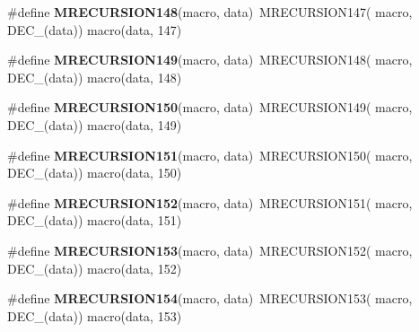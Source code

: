 \begin{DoxyCompactItemize}
\item 
\hypertarget{group__group__sam0__utils__mrecursion_ga2bcf729fdb108d8f8cf420b07388906d}{}\#define {\bfseries M\+R\+E\+C\+U\+R\+S\+I\+O\+N148}(macro,  data)~M\+R\+E\+C\+U\+R\+S\+I\+O\+N147(  macro, D\+E\+C\+\_\+(data))   macro(data, 147)\label{group__group__sam0__utils__mrecursion_ga2bcf729fdb108d8f8cf420b07388906d}

\item 
\hypertarget{group__group__sam0__utils__mrecursion_ga6d1a3c19222c7ee8771101e98a959fb7}{}\#define {\bfseries M\+R\+E\+C\+U\+R\+S\+I\+O\+N149}(macro,  data)~M\+R\+E\+C\+U\+R\+S\+I\+O\+N148(  macro, D\+E\+C\+\_\+(data))   macro(data, 148)\label{group__group__sam0__utils__mrecursion_ga6d1a3c19222c7ee8771101e98a959fb7}

\item 
\hypertarget{group__group__sam0__utils__mrecursion_gabb9799f7a5fef3fb5fa69e1bef4ff318}{}\#define {\bfseries M\+R\+E\+C\+U\+R\+S\+I\+O\+N150}(macro,  data)~M\+R\+E\+C\+U\+R\+S\+I\+O\+N149(  macro, D\+E\+C\+\_\+(data))   macro(data, 149)\label{group__group__sam0__utils__mrecursion_gabb9799f7a5fef3fb5fa69e1bef4ff318}

\item 
\hypertarget{group__group__sam0__utils__mrecursion_gafbbfc4f5157baa8750ce7782323a9f5a}{}\#define {\bfseries M\+R\+E\+C\+U\+R\+S\+I\+O\+N151}(macro,  data)~M\+R\+E\+C\+U\+R\+S\+I\+O\+N150(  macro, D\+E\+C\+\_\+(data))   macro(data, 150)\label{group__group__sam0__utils__mrecursion_gafbbfc4f5157baa8750ce7782323a9f5a}

\item 
\hypertarget{group__group__sam0__utils__mrecursion_ga06ffc91df193dcdab63b568718773b02}{}\#define {\bfseries M\+R\+E\+C\+U\+R\+S\+I\+O\+N152}(macro,  data)~M\+R\+E\+C\+U\+R\+S\+I\+O\+N151(  macro, D\+E\+C\+\_\+(data))   macro(data, 151)\label{group__group__sam0__utils__mrecursion_ga06ffc91df193dcdab63b568718773b02}

\item 
\hypertarget{group__group__sam0__utils__mrecursion_gaa4af965a0bd2fa1bb023f774cbf18132}{}\#define {\bfseries M\+R\+E\+C\+U\+R\+S\+I\+O\+N153}(macro,  data)~M\+R\+E\+C\+U\+R\+S\+I\+O\+N152(  macro, D\+E\+C\+\_\+(data))   macro(data, 152)\label{group__group__sam0__utils__mrecursion_gaa4af965a0bd2fa1bb023f774cbf18132}

\item 
\hypertarget{group__group__sam0__utils__mrecursion_ga1d5ab6221edda6ab4d5438c93ffc9389}{}\#define {\bfseries M\+R\+E\+C\+U\+R\+S\+I\+O\+N154}(macro,  data)~M\+R\+E\+C\+U\+R\+S\+I\+O\+N153(  macro, D\+E\+C\+\_\+(data))   macro(data, 153)\label{group__group__sam0__utils__mrecursion_ga1d5ab6221edda6ab4d5438c93ffc9389}


\end{DoxyCompactItemize}
